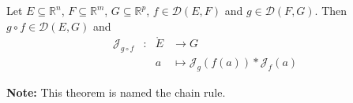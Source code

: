 \documentclass[11pt,en]{elegantpaper}
\newcommand{\Real}{\mathbb{R}}
\begin{document}
\begin{theorem}\label{theo:chain_rule}
  {\normalfont
    Let $E \subseteq \Real^n$, $F \subseteq \Real^m$, $G \subseteq \Real^p$, $f \in \mathcal{D}(E,F)$ and $g \in \mathcal{D}(F,G)$.
    Then $g \circ f \in \mathcal{D}(E,G)$ and \begin{equation}\label{theo:chain_rule_eq}
      \begin{array}{llll}
        \mathcal{J}_{g \circ f} & : & \mathring{E} & \longrightarrow G \\
        &   & a & \longmapsto \mathcal{J}_{g}(f(a)) * \mathcal{J}_{f}(a)
      \end{array}
    \end{equation} \par
    \textbf{Note:} This theorem is named the chain rule.
  }
\end{theorem}
\end{document}
